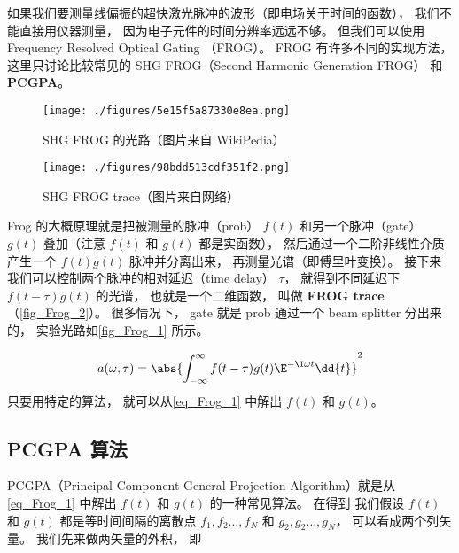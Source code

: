 
\begin{issues}
\issueMissDepend
\end{issues}

如果我们要测量线偏振的超快激光脉冲的波形（即电场关于时间的函数）， 我们不能直接用仪器测量， 因为电子元件的时间分辨率远远不够。 但我们可以使用 Frequency Resolved Optical Gating （FROG）。 FROG 有许多不同的实现方法， 这里只讨论比较常见的 SHG FROG（Second Harmonic Generation FROG） 和 \textbf{PCGPA}。

\begin{figure}[ht]
\centering
\texttt{[image: ./figures/5e15f5a87330e8ea.png]}
\caption{SHG FROG 的光路（图片来自 WikiPedia）} \label{fig_Frog_1}
\end{figure}

\begin{figure}[ht]
\centering
\texttt{[image: ./figures/98bdd513cdf351f2.png]}
\caption{SHG FROG trace（图片来自网络）} \label{fig_Frog_2}
\end{figure}

Frog 的大概原理就是把被测量的脉冲（prob） $f(t)$ 和另一个脉冲（gate） $g(t)$ 叠加（注意 $f(t)$ 和 $g(t)$ 都是实函数）， 然后通过一个二阶非线性介质产生一个 $f(t)g(t)$ 脉冲并分离出来， 再测量光谱（即傅里叶变换）。 接下来我们可以控制两个脉冲的相对延迟（time delay） $\tau$， 就得到不同延迟下 $f(t - \tau)g(t)$ 的光谱， 也就是一个二维函数， 叫做 \textbf{FROG trace}（\autoref{fig_Frog_2}）。 很多情况下， gate 就是 prob 通过一个 beam splitter 分出来的， 实验光路如\autoref{fig_Frog_1} 所示。%

\begin{equation}\label{eq_Frog_1}
a(\omega, \tau) = \abs{\int_{-\infty}^{\infty} f(t-\tau) g(t) \E^{-\I\omega t} \dd{t}}^2
\end{equation}
只要用特定的算法， 就可以从\autoref{eq_Frog_1} 中解出 $f(t)$ 和 $g(t)$。

\subsection{PCGPA 算法}

PCGPA（Principal Component General Projection Algorithm）就是从\autoref{eq_Frog_1} 中解出 $f(t)$ 和 $g(t)$ 的一种常见算法。 在得到 我们假设 $f(t)$ 和 $g(t)$ 都是等时间间隔的离散点 $f_1, f_2\dots, f_N$ 和 $g_2, g_2\dots, g_N$， 可以看成两个列矢量。 我们先来做两矢量的外积， 即

